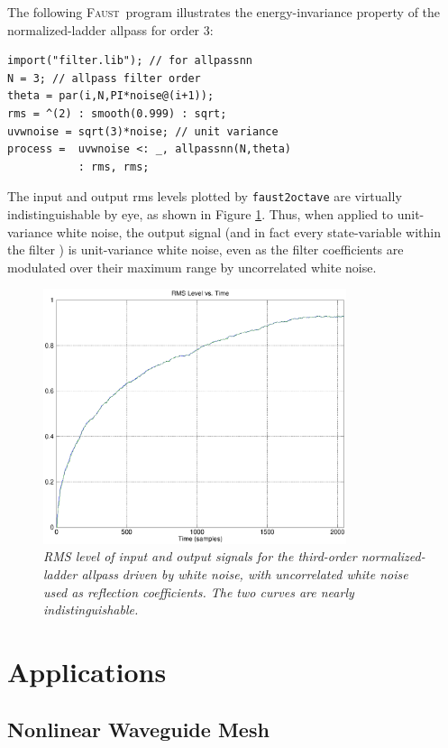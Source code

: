 \documentclass[twoside,a4paper]{article}
\newcommand{\Faust}{\textsc{Faust}}
\newcommand{\Faustsp}{\Faust\ }
\begin{document}
The following \Faustsp program illustrates the energy-invariance property
of the normalized-ladder allpass for order 3:
\begin{verbatim}
import("filter.lib"); // for allpassnn
N = 3; // allpass filter order
theta = par(i,N,PI*noise@(i+1));
rms = ^(2) : smooth(0.999) : sqrt;
uvwnoise = sqrt(3)*noise; // unit variance
process =  uvwnoise <: _, allpassnn(N,theta) 
           : rms, rms;
\end{verbatim}
The input and output rms levels plotted by \texttt{faust2octave} are
virtually indistinguishable by eye, as shown in Figure \ref{tapnn2}.
Thus, when applied to unit-variance white noise, the output signal
(and in fact every state-variable within the filter
\cite{GrayAndMarkel75}) is unit-variance white noise, even as the
filter coefficients are modulated over their maximum range by
uncorrelated white noise.

\begin{figure}[ht]
\center
\includegraphics[width=3.5in]{eps/tapnn2.eps}
\caption{\label{tapnn2}{\it RMS level of input and output signals
for the third-order normalized-ladder allpass driven by white noise,
with uncorrelated white noise used as reflection coefficients.  The two
curves are nearly indistinguishable.}}
\end{figure} 

\section{Applications}

\subsection{Nonlinear Waveguide Mesh}
\end{document}
